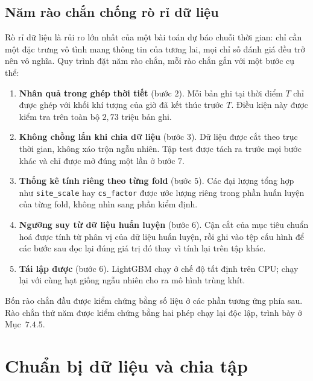 \documentclass[12pt, a4paper]{report}
\begin{document}
\FloatBarrier
\subsection{Năm rào chắn chống rò rỉ dữ liệu}

Rò rỉ dữ liệu là rủi ro lớn nhất của một bài toán dự báo chuỗi thời gian: chỉ cần một
đặc trưng vô tình mang thông tin của tương lai, mọi chỉ số đánh giá đều trở nên vô
nghĩa. Quy trình đặt năm rào chắn, mỗi rào chắn gắn với một bước cụ thể:

\begin{enumerate}
    \item \textbf{Nhân quả trong ghép thời tiết} (bước $2$). Mỗi bản ghi tại thời điểm
    $T$ chỉ được ghép với khối khí tượng của giờ đã kết thúc trước $T$. Điều kiện này
    được kiểm tra trên toàn bộ $2{,}73$ triệu bản ghi.

    \item \textbf{Không chồng lấn khi chia dữ liệu} (bước $3$). Dữ liệu được cắt theo
    trục thời gian, không xáo trộn ngẫu nhiên. Tập test được tách ra trước mọi bước
    khác và chỉ được mở đúng một lần ở bước $7$.

    \item \textbf{Thống kê tính riêng theo từng fold} (bước $5$). Các đại lượng tổng
    hợp như \texttt{site\_scale} hay \texttt{cs\_factor} được ước lượng riêng trong
    phần huấn luyện của từng fold, không nhìn sang phần kiểm định.

    \item \textbf{Ngưỡng suy từ dữ liệu huấn luyện} (bước $6$). Cận cắt của mục tiêu
    chuẩn hoá được tính từ phân vị của dữ liệu huấn luyện, rồi ghi vào tệp cấu hình để
    các bước sau đọc lại đúng giá trị đó thay vì tính lại trên tập khác.

    \item \textbf{Tái lập được} (bước $6$). LightGBM chạy ở chế độ tất định trên CPU;
    chạy lại với cùng hạt giống ngẫu nhiên cho ra mô hình trùng khít.
\end{enumerate}

Bốn rào chắn đầu được kiểm chứng bằng số liệu ở các phần tương ứng phía sau. Rào chắn
thứ năm được kiểm chứng bằng hai phép chạy lại độc lập, trình bày ở Mục~$7.4.5$.

\FloatBarrier
\section{Chuẩn bị dữ liệu và chia tập}
\end{document}
